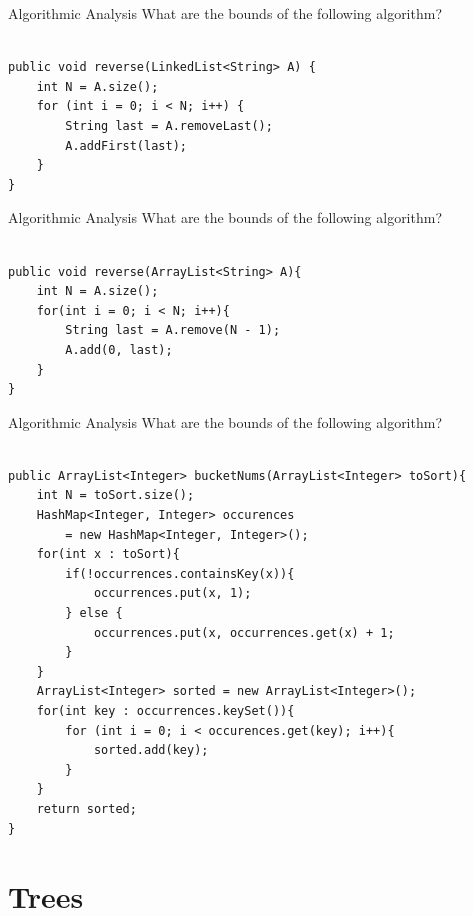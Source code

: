 \documentclass[9pt]{beamer}
\begin{document}
\begin{frame}[fragile]{Algorithmic Analysis}
What are the bounds of the following algorithm? \\
\\
{
\begin{lstlisting}
public void reverse(LinkedList<String> A) {
    int N = A.size();
    for (int i = 0; i < N; i++) {
        String last = A.removeLast();
        A.addFirst(last);
    }
}
  \end{lstlisting}
  }
\end{frame}

\begin{frame}[fragile]{Algorithmic Analysis}
What are the bounds of the following algorithm? \\
\\
{
\begin{lstlisting}
public void reverse(ArrayList<String> A){
    int N = A.size();
    for(int i = 0; i < N; i++){
        String last = A.remove(N - 1);
        A.add(0, last);
    }
}
  \end{lstlisting}
  }
\end{frame}

\begin{frame}[fragile]{Algorithmic Analysis}
What are the bounds of the following algorithm? \\
 \\
{ \footnotesize 
\begin{lstlisting}
public ArrayList<Integer> bucketNums(ArrayList<Integer> toSort){
    int N = toSort.size();
    HashMap<Integer, Integer> occurences 
        = new HashMap<Integer, Integer>();
    for(int x : toSort){
        if(!occurrences.containsKey(x)){
            occurrences.put(x, 1);
        } else {
            occurrences.put(x, occurrences.get(x) + 1;
        }
    }
    ArrayList<Integer> sorted = new ArrayList<Integer>();
    for(int key : occurrences.keySet()){
        for (int i = 0; i < occurences.get(key); i++){
            sorted.add(key);
        }
    }
    return sorted;
}
  \end{lstlisting}
  }
\end{frame}


\section{Trees}
\end{document}
